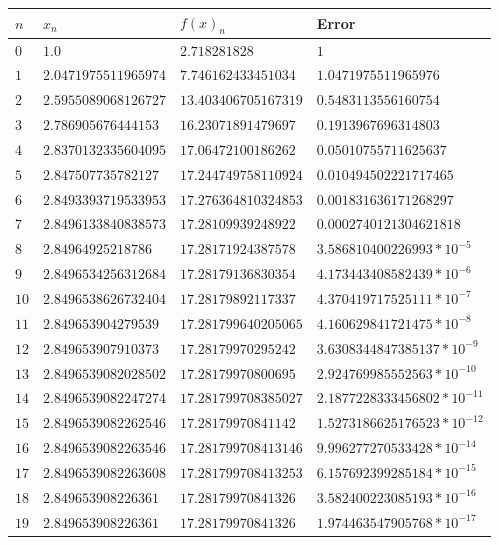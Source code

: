 \documentclass[12pt]{article}
\begin{document}
        \begin{center}
            \begin{tabular}{|l|l|l|l|} \hline
            $n$ & $x_{n}$ & $f(x)_{n}$ & Error \\
            \hline \hline
            $0$ & $1.0$ & $2.718281828$ & $1$    \\
            \hline 
            $1$ & $2.0471975511965974$ & $7.746162433451034$ & $1.0471975511965976$\\
            \hline 
            $2$ & $2.5955089068126727$ & $13.403406705167319$ & $0.5483113556160754$\\
            \hline 
            $3$ & $2.786905676444153$ & $16.23071891479697$ & $0.1913967696314803$\\
            \hline 
            $4$ & $2.8370132335604095$ & $17.06472100186262$ & $0.05010755711625637$\\
            \hline 
            $5$ & $2.847507735782127$ & $17.244749758110924$ & $0.010494502221717465$\\
            \hline 
            $6$ & $2.8493393719533953$ & $17.276364810324853$ & $0.001831636171268297$\\
            \hline 
            $7$ & $2.8496133840838573$ & $17.28109939248922$ & $0.0002740121304621818$\\
            \hline 
            $8$ & $2.84964925218786$ & $17.28171924387578$ & $3.586810400226993* 10^{-5}$\\
            \hline 
            $9$ & $2.8496534256312684$ & $17.28179136830354$ & $4.173443408582439 * 10^{-6}$\\
            \hline 
            $10$ & $2.8496538626732404$ & $17.28179892117337$ & $4.370419717525111* 10^{-7}$\\
            \hline
            $11$ & $2.849653904279539$ & $17.281799640205065$ & $4.160629841721475* 10^{-8}$\\
            \hline
            $12$ & $2.849653907910373$ & $17.28179970295242$ & $ 3.6308344847385137* 10^{-9}$\\
            \hline
            $13$ & $2.8496539082028502$ & $17.28179970800695$ & $2.924769985552563 * 10^{-10}$\\
            \hline
            $14$ & $2.8496539082247274$ & $17.281799708385027$ & $2.1877228333456802 * 10^{-11}$\\
            \hline
            $15$ & $2.8496539082262546$ & $17.28179970841142$ & $1.5273186625176523 * 10^{-12}$\\
            \hline
            $16$ & $2.8496539082263546$ & $17.281799708413146$ & $9.996277270533428 * 10^{-14}$\\
            \hline
            $17$ & $2.8496539082263608$ & $17.281799708413253$ & $6.157692399285184 * 10^{-15}$\\
            \hline
            $18$ & $2.849653908226361$ & $17.28179970841326$ & $3.582400223085193 * 10^{-16}$\\
            \hline
            $19$ & $2.849653908226361$ & $17.28179970841326$ & $1.974463547905768 * 10^{-17}$\\
            \hline
            \end{tabular}
        \end{center}
\end{document}

